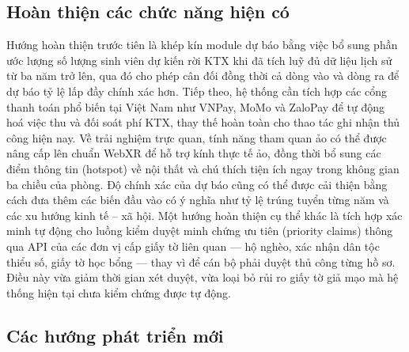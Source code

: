 \documentclass[../DoAn.tex]{subfiles}
\begin{document}
\subsection{Hoàn thiện các chức năng hiện có}
\label{subsection:6.2.1}

Hướng hoàn thiện trước tiên là khép kín module dự báo bằng việc bổ sung phần
ước lượng số lượng sinh viên dự kiến rời KTX khi đã tích luỹ đủ dữ liệu lịch
sử từ ba năm trở lên, qua đó cho phép cân đối đồng thời cả dòng vào và dòng ra
để dự báo tỷ lệ lấp đầy chính xác hơn. Tiếp theo, hệ thống cần tích hợp các
cổng thanh toán phổ biến tại Việt Nam như VNPay, MoMo và ZaloPay để tự động hoá
việc thu và đối soát phí KTX, thay thế hoàn toàn cho thao tác ghi nhận thủ công
hiện nay. Về trải nghiệm trực quan, tính năng tham quan ảo có thể được nâng cấp
lên chuẩn WebXR để hỗ trợ kính thực tế ảo, đồng thời bổ sung các điểm thông tin
(hotspot) về nội thất và chú thích tiện ích ngay trong không gian ba chiều của
phòng. Độ chính xác của dự báo cũng có thể được cải thiện bằng cách đưa thêm
các biến đầu vào có ý nghĩa như tỷ lệ trúng tuyển từng năm và các xu hướng kinh
tế -- xã hội. Một hướng hoàn thiện cụ thể khác là tích hợp xác minh tự động cho
luồng kiểm duyệt minh chứng ưu tiên (priority claims) thông qua API của các đơn
vị cấp giấy tờ liên quan --- hộ nghèo, xác nhận dân tộc thiểu số, giấy tờ học
bổng --- thay vì để cán bộ phải duyệt thủ công từng hồ sơ. Điều này vừa giảm
thời gian xét duyệt, vừa loại bỏ rủi ro giấy tờ giả mạo mà hệ thống hiện tại
chưa kiểm chứng được tự động.

\subsection{Các hướng phát triển mới}
\label{subsection:6.2.2}
\end{document}
